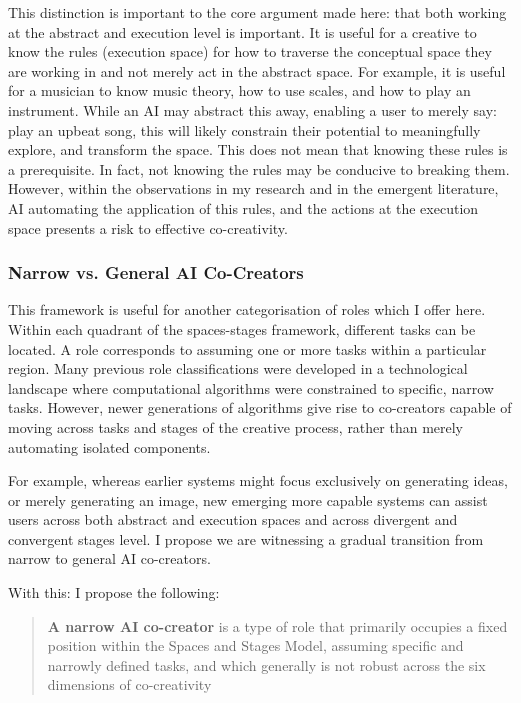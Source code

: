 This distinction is important to the core argument made here: that both working at the abstract and execution level is important. It is useful for a creative to know the rules (execution space) for how to traverse the conceptual space they are working in and not merely act in the abstract space. For example, it is useful for a musician to know music theory, how to use scales, and how to play an instrument. While an AI may abstract this away, enabling a user to merely say: play an upbeat song, this will likely constrain their potential to meaningfully explore, and transform the space. This does not mean that knowing these rules is a prerequisite. In fact, not knowing the rules may be conducive to breaking them. However, within the observations in my research and in the emergent literature, AI automating the application of this rules, and the actions at the execution space presents a risk to effective co-creativity. 


\subsubsection{Narrow vs. General AI Co-Creators}

This framework is useful for another categorisation of roles which I offer here. Within each quadrant of the spaces-stages framework, different tasks can be located. A role corresponds to assuming one or more tasks within a particular region. Many previous role classifications were developed in a technological landscape where computational algorithms were constrained to specific, narrow tasks. However, newer generations of algorithms give rise to co-creators capable of moving across tasks and stages of the creative process, rather than merely automating isolated components.

For example, whereas earlier systems might focus exclusively on generating ideas, or merely generating an image, new emerging more capable systems can assist users across both abstract and execution spaces and across divergent and convergent stages level. I propose we are witnessing a gradual transition from narrow to general AI co-creators.

With this: I propose the following: 

\begin{quote}
    \textbf{A narrow AI co-creator} is a type of role that primarily occupies a fixed position within the Spaces and Stages Model, assuming specific and narrowly defined tasks, and which generally is not robust across the six dimensions of co-creativity
\end{quote}

